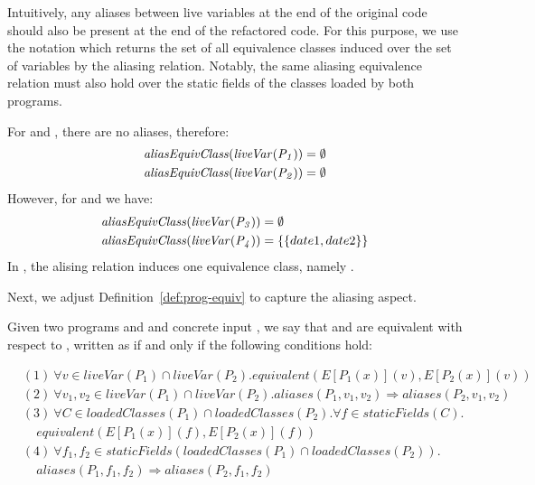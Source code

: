 \documentclass[runningheads,a4paper]{llncs}
\begin{document}
Intuitively, any aliases between live variables at the end of the original code should also
be present at the end of the refactored code. For this purpose, we use the notation
 which returns the set of all equivalence classes induced over the
set of variables  by the aliasing relation.  
Notably, the same aliasing equivalence relation must also hold over the
static fields of the classes loaded by both programs.


\begin{example}
For  and , there are no aliases, therefore:
\[
\begin{aligned}[t]
  \mathit{{aliasEquivClass(liveVar(P_1))}} &= \emptyset\\
  \mathit{{aliasEquivClass(liveVar(P_2))}} &= \emptyset
\end{aligned}
\]
%
However, for  and  we have:
\[
\begin{aligned}[t]
  \mathit{{aliasEquivClass(liveVar(P_3))}} &= \emptyset\\
  \mathit{{aliasEquivClass(liveVar(P_4))}} &= \{\{date1, date2\}\}
\end{aligned}
\]
In , the alising relation induces one equivalence class, namely .

\end{example}
  
Next, we adjust Definition~\ref{def:prog-equiv} to capture the aliasing aspect.

\begin{definition}\label{def:prog-equiv}
  Given two programs  and  and concrete input ,
  we say that  and  are equivalent
  with respect to , written as 
  if and only if the following conditions hold:

\[
    \begin{aligned}
      & (1)~ \forall v\in liveVar(P_1)\cap liveVar(P_2). equivalent(E[P_1(x)](v), E[P_2(x)](v))\\
& (2)~ \forall v_1,v_2 \in liveVar(P_1) \cap liveVar(P_2). aliases(P_1, v_1, v_2) \Rightarrow aliases(P_2, v_1,v_2)\\      
& (3)~  \forall C \in loadedClasses(P_1) \cap loadedClasses(P_2).\forall f \in staticFields(C).\\
      &  ~~~~~ equivalent(E[P_1(x)](f), E[P_2(x)](f))\\
      & (4)~\forall f_1,f_2 \in staticFields(loadedClasses(P_1) \cap loadedClasses(P_2)).\\
      & ~~~~~ aliases(P_1, f_1, f_2) \Rightarrow aliases(P_2, f_1,f_2)
    \end{aligned}
    \]
   
  \end{definition}
\end{document}
